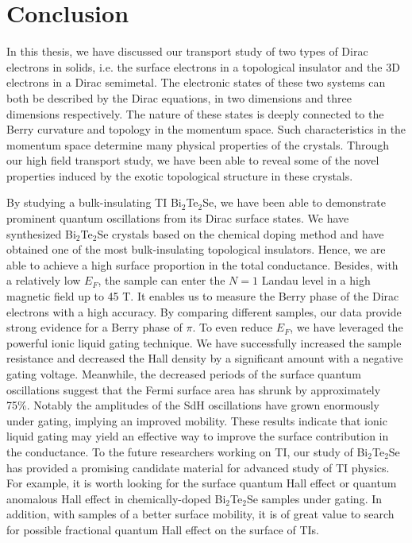 
\chapter{Conclusion\label{ch:conclusion}}

In this thesis, we have discussed our transport study of two types of Dirac electrons in solids, i.e. the surface electrons in a topological insulator and the 3D electrons in a Dirac semimetal. The electronic states of these two systems can both be described by the Dirac equations, in two dimensions and three dimensions respectively. The nature of these states is deeply connected to the Berry curvature and topology in the momentum space. Such characteristics in the momentum space determine many physical properties of the crystals. Through our high field transport study, we have been able to reveal some of the novel properties induced by the exotic topological structure in these crystals.

By studying a bulk-insulating TI Bi$_2$Te$_2$Se, we have been able to demonstrate prominent quantum oscillations from its Dirac surface states. We have synthesized Bi$_2$Te$_2$Se crystals based on the chemical doping method and have obtained one of the most bulk-insulating topological insulators. Hence, we are able to achieve a high surface proportion in the total conductance. Besides, with a relatively low $E_F$, the sample can enter the $N=1$ Landau level in a high magnetic field up to 45 T. It enables us to measure the Berry phase of the Dirac electrons with a high accuracy. By comparing different samples, our data provide strong evidence for a Berry phase of $\pi$. To even reduce $E_F$, we have leveraged the powerful ionic liquid gating technique. We have successfully increased the sample resistance and decreased the Hall density by a significant amount with a negative gating voltage. Meanwhile, the decreased periods of the surface quantum oscillations suggest that the Fermi surface area has shrunk by approximately 75\%. Notably the amplitudes of the SdH oscillations have grown enormously under gating, implying an improved mobility. These results indicate that ionic liquid gating may yield an effective way to improve the surface contribution in the conductance. To the future researchers working on TI, our study of Bi$_2$Te$_2$Se has provided a promising candidate material for advanced study of TI physics. For example, it is worth looking for the surface quantum Hall effect or quantum anomalous Hall effect in chemically-doped Bi$_2$Te$_2$Se samples under gating. In addition, with samples of a better surface mobility, it is of great value to search for possible fractional quantum Hall effect on the surface of TIs. 

